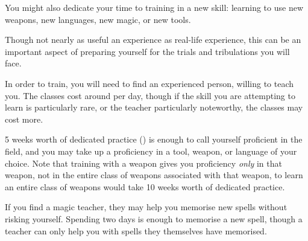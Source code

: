 You might also dedicate your time to training in a new skill: learning to use new weapons, new languages, new magic, or new tools. 

Though not nearly as useful an experience as real-life experience, this can be an important aspect of preparing yourself for the trials and tribulations you will face. 

In order to train, you will need to find an experienced person, willing to teach you. The classes cost around  per day, though if the skill you are attempting to learn is particularly rare, or the teacher particularly noteworthy, the classes may cost more.  

5 weeks worth of dedicated practice () is enough to call yourself proficient in the field, and you may take up a proficiency in a tool, weapon, or language of your choice. Note that training with a weapon gives you proficiency {\it only} in that weapon, not in the entire class of weapons associated with that weapon, to learn an entire class of weapons would take 10 weeks worth of dedicated practice. 

If you find a magic teacher, they may help you memorise new spells without risking yourself. Spending two days is enough to memorise a new spell, though a teacher can only help you with spells they themselves have memorised. 
